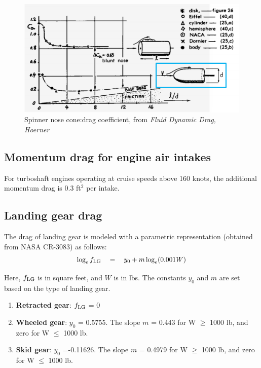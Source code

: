 \begin{figure}
\begin{center}
\includegraphics[width=\textwidth]{images/fus_drag.png}
\caption{Spinner nose cone:drag coefficient, from \emph{Fluid Dynamic Drag, Hoerner}}
\label{fig:fus_drag}
\end{center}
\end{figure}

\subsection{Momentum drag for engine air intakes}
For turboshaft engines operating at cruise speeds above 160 knots, the additional momentum drag is 0.3 ft$^2$ per intake.

\subsection{Landing gear drag}
The drag of landing gear is modeled with a parametric representation (obtained from NASA CR-3083) as follows:
\begin{equation}
\log_e f_{\rm LG} \quad = \quad y_0 + m \log_e(0.001 W)
\end{equation}

Here, $f_{\rm LG}$ is in square feet, and $W$ is in lbs. The constants $y_0$ and $m$ are set based on the type of landing gear. 
\begin{enumerate}
\item \textbf{Retracted gear}: $f_{\rm LG}$ = 0
\item \textbf{Wheeled gear}: $y_0$ = 0.5755. The slope $m$ = 0.443  for W $\geq$ 1000 lb, and zero for W $\leq$ 1000 lb.
\item \textbf{Skid gear}:  $y_0$ =-0.11626. The slope $m$ = 0.4979  for W $\geq$ 1000 lb, and zero for W $\leq$ 1000 lb.
\end{enumerate}

